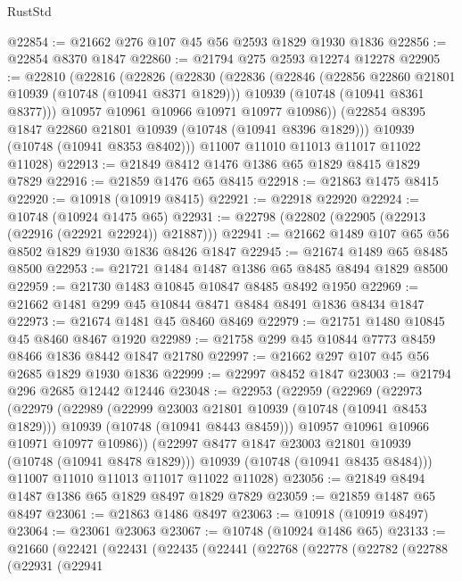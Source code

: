 \begin{lexlean}{RustStd}
\begin{coremodule}
{\begin{coremodule}
{{{{{@22854 := @21662 @276 @107 @45 @56 @2593 @1829 @1930 @1836
@22856 := @22854 @8370 @1847
@22860 := @21794 @275 @2593 @12274 @12278
@22905 := @22810
    (@22816
      (@22826
        (@22830
          (@22836
            (@22846
              (@22856 @22860 @21801 @10939 (@10748 (@10941 @8371 @1829)))
              @10939
              (@10748 (@10941 @8361 @8377)))
            @10957
            @10961
            @10966
            @10971
            @10977
            @10986))
        (@22854 @8395 @1847 @22860 @21801 @10939 (@10748 (@10941 @8396 @1829)))
        @10939
        (@10748 (@10941 @8353 @8402)))
      @11007
      @11010
      @11013
      @11017
      @11022
      @11028)
@22913 := @21849 @8412 @1476 @1386 @65 @1829 @8415 @1829 @7829
@22916 := @21859 @1476 @65 @8415
@22918 := @21863 @1475 @8415
@22920 := @10918 (@10919 @8415)
@22921 := @22918 @22920
@22924 := @10748 (@10924 @1475 @65)
@22931 := @22798 (@22802 (@22905 (@22913 (@22916 (@22921 @22924)) @21887)))
@22941 := @21662 @1489 @107 @65 @56 @8502 @1829 @1930 @1836 @8426 @1847
@22945 := @21674 @1489 @65 @8485 @8500
@22953 := @21721 @1484 @1487 @1386 @65 @8485 @8494 @1829 @8500
@22959 := @21730 @1483 @10845 @10847 @8485 @8492 @1950
@22969 := @21662 @1481 @299 @45 @10844 @8471 @8484 @8491 @1836 @8434 @1847
@22973 := @21674 @1481 @45 @8460 @8469
@22979 := @21751 @1480 @10845 @45 @8460 @8467 @1920
@22989 := @21758 @299 @45 @10844 @7773 @8459 @8466 @1836 @8442 @1847 @21780
@22997 := @21662 @297 @107 @45 @56 @2685 @1829 @1930 @1836
@22999 := @22997 @8452 @1847
@23003 := @21794 @296 @2685 @12442 @12446
@23048 := @22953
    (@22959
      (@22969
        (@22973
          (@22979
            (@22989
              (@22999 @23003 @21801 @10939 (@10748 (@10941 @8453 @1829)))
              @10939
              (@10748 (@10941 @8443 @8459)))
            @10957
            @10961
            @10966
            @10971
            @10977
            @10986))
        (@22997 @8477 @1847 @23003 @21801 @10939 (@10748 (@10941 @8478 @1829)))
        @10939
        (@10748 (@10941 @8435 @8484)))
      @11007
      @11010
      @11013
      @11017
      @11022
      @11028)
@23056 := @21849 @8494 @1487 @1386 @65 @1829 @8497 @1829 @7829
@23059 := @21859 @1487 @65 @8497
@23061 := @21863 @1486 @8497
@23063 := @10918 (@10919 @8497)
@23064 := @23061 @23063
@23067 := @10748 (@10924 @1486 @65)
@23133 := @21660
    (@22421
      (@22431
        (@22435
          (@22441
            (@22768
              (@22778
                (@22782
                  (@22788
                    (@22931
                      (@22941
}}}}}
\end{coremodule}}
\end{coremodule}
\end{lexlean}
